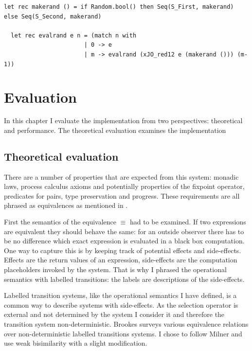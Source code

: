 \documentclass[12pt,twoside,notitlepage]{report}
\theoremstyle{plain}%
\theoremstyle{definition}
\theoremstyle{remark}
\begin{document}
\begin{minipage}{\linewidth}

\begin{lstlisting}[caption={OCaml random scheduler}, label={lst:ocamlrandsched}]
  let rec makerand () = if Random.bool() then Seq(S_First, makerand) else Seq(S_Second, makerand)
  
  let rec evalrand e n = (match n with 
                       | 0 -> e
                       | m -> evalrand (xJO_red12 e (makerand ())) (m-1))
\end{lstlisting}

\end{minipage}


\cleardoublepage
\chapter{Evaluation}
In this chapter I evaluate the implementation from two perspectives: theoretical and performance. The theoretical evaluation examines the implementation 


\section{Theoretical evaluation}
\label{sec:behave_equiv}
There are a number of properties that are expected from this system: monadic laws, process calculus axioms and potentially properties of the fixpoint operator, predicates for pairs, type preservation and progress. These requirements are all phrased as equivalences as mentioned in . 

First the semantics of the equivalence $ \equiv $ had to be examined. If two expressions are equivalent they should behave the same: for an outside observer there has to be no difference which exact expression is evaluated in a black box computation. One way to capture this is by keeping track of potential effects and side-effects. Effects are the return values of an expression, side-effects are the computation placeholders invoked by the system. That is why I phrased the operational semantics with labelled transitions: the labels are descriptions of the side-effects.

Labelled transition systems, like the operational semantics I have defined, is a common way to describe systems with side-effects. As the selection operator is external and not determined by the system I consider it and therefore the transition system non-deterministic. Brookes\cite{brookes1983behavioural} surveys various equivalence relations over non-deterministic labelled transitions systems. I chose to follow Milner\cite{milner1982calculus} and use weak bisimilarity with a slight modification.
\end{document}
